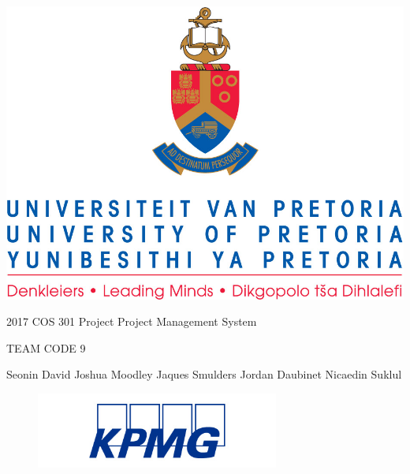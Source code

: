 \documentclass{article}
\begin{document}
    
    \begin{center}
        \includegraphics{Graphics/uplogo.jpg}
        
        {\Huge 
        2017 COS 301 Project \linebreak
        Project Management System \linebreak 
        \par}
        
        {\Huge
        TEAM CODE 9
        \linebreak
        \par}
        
        \begin{LARGE}
            Seonin David
            \linebreak
            \linebreak
            Joshua Moodley
            \linebreak
            \linebreak
            Jaques Smulders
            \linebreak
            \linebreak
            Jordan Daubinet
            \linebreak
            \linebreak
            Nicaedin Suklul
        \end{LARGE}
    \end{center}
    
    \begin{figure}[b]
    \centering
        \includegraphics[width=8cm]{Graphics/kpmgLogo.jpg}
    \end{figure}
    
\end{document}
